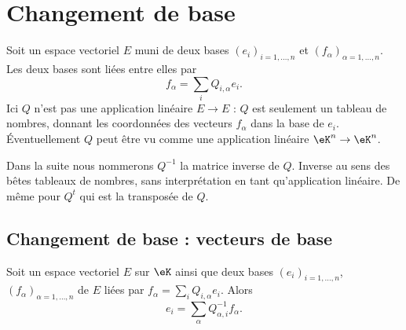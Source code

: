 
\section{Changement de base}

Soit un espace vectoriel \( E\) muni de deux bases \( (e_i)_{i=1,\ldots, n}\) et \( (f_{\alpha})_{\alpha=1,\ldots, n}\). Les deux bases sont liées entre elles par
\begin{equation}        \label{EQooFRQRooSMsQQB}
	f_{\alpha}=\sum_i Q_{i,\alpha}e_i.
\end{equation}
Ici \( Q\) n'est pas une application linéaire \( E\to E\) : \( Q\) est seulement un tableau de nombres, donnant les coordonnées des vecteurs \( f_{\alpha}\) dans la base de \( e_i\). Éventuellement \( Q\) peut être vu comme une application linéaire \( \eK^n\to \eK^n\).

Dans la suite nous nommerons \( Q^{-1}\) la matrice inverse de \( Q\). Inverse au sens des bêtes tableaux de nombres, sans interprétation en tant qu'application linéaire. De même pour \( Q^t\) qui est la transposée de \( Q\).

\subsection{Changement de base : vecteurs de base}

\begin{lemma}       \label{LEMooIHZGooOZoYZd}
	Soit un espace vectoriel \( E\) sur \( \eK\) ainsi que deux bases \( (e_i)_{i=1,\ldots, n}\), \( (f_{\alpha})_{\alpha=1,\ldots, n}\) de \( E\) liées par \( f_{\alpha}=\sum_i Q_{i,\alpha}e_i\). Alors
	\begin{equation}    \label{EQooZQPAooAbKAdg}
		e_i=\sum_{\alpha}Q^{-1}_{\alpha, i}f_{\alpha}.
	\end{equation}
\end{lemma}

